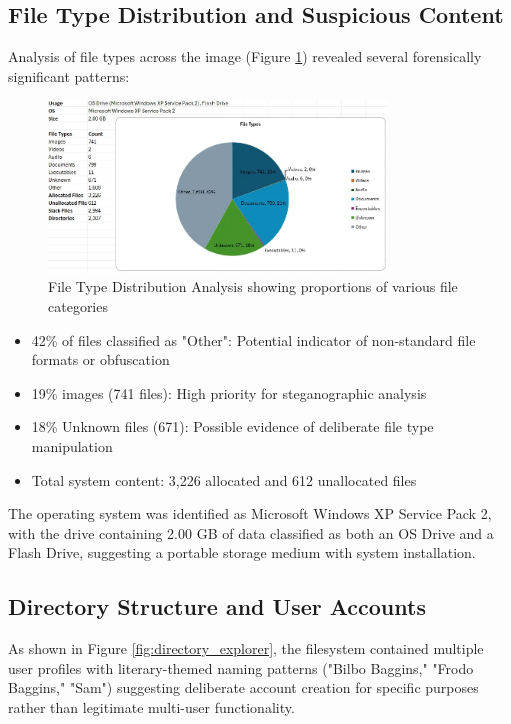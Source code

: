 \subsection{File Type Distribution and Suspicious Content}
Analysis of file types across the image (Figure \ref{fig:file_types}) revealed several forensically significant patterns:

\begin{figure}[htbp]
    \centering
    \includegraphics[width=0.8\textwidth]{images/Evidence Examination/Image2.png}
    \caption{File Type Distribution Analysis showing proportions of various file categories}
    \label{fig:file_types}
\end{figure}

\begin{itemize}
    \item 42\% of files classified as "Other": Potential indicator of non-standard file formats or obfuscation
    \item 19\% images (741 files): High priority for steganographic analysis
    \item 18\% Unknown files (671): Possible evidence of deliberate file type manipulation
    \item Total system content: 3,226 allocated and 612 unallocated files
\end{itemize}

The operating system was identified as Microsoft Windows XP Service Pack 2, with the drive containing 2.00 GB of data classified as both an OS Drive and a Flash Drive, suggesting a portable storage medium with system installation.

\subsection{Directory Structure and User Accounts}
As shown in Figure \ref{fig:directory_explorer}, the filesystem contained multiple user profiles with literary-themed naming patterns ("Bilbo Baggins," "Frodo Baggins," "Sam") suggesting deliberate account creation for specific purposes rather than legitimate multi-user functionality.

